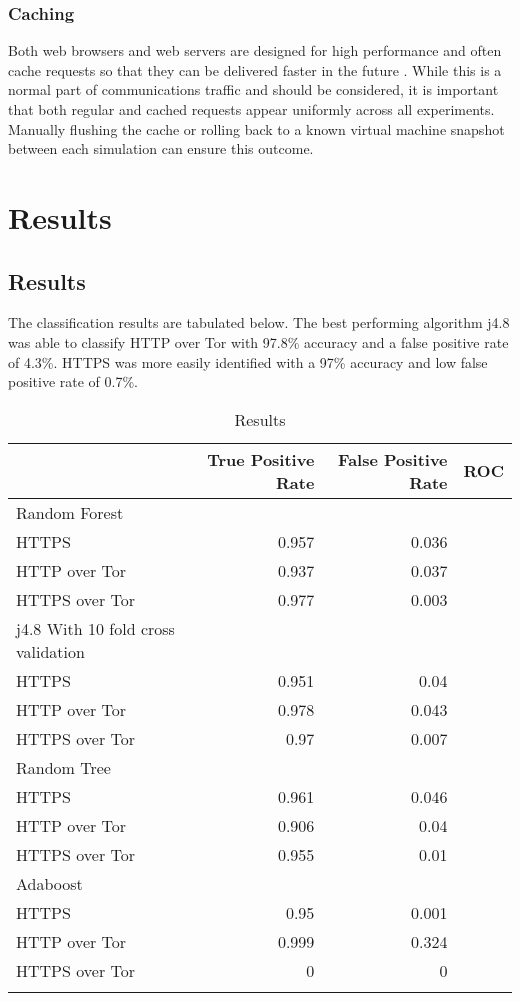 \documentclass{ecuthesis}
\begin{document}
\subsection{Caching}

Both web browsers and web servers are designed for high performance and often
cache requests so that they can be delivered faster in the future
\parencite{Caceres:1998p7419}. While this is a normal part of communications
traffic and should be considered, it is important that both regular and cached
requests appear uniformly across all experiments. Manually flushing the cache
or rolling back to a known virtual machine snapshot between each simulation can
ensure this outcome.



\chapter{Results}

\section{Results}

The classification results are tabulated below. The best performing algorithm
j4.8 was able to classify HTTP over Tor with 97.8\% accuracy and a false
positive rate of 4.3\%. HTTPS was more easily identified with a 97\% accuracy
and low false positive rate of 0.7\%.

\begin{table}
  \begin{tabular}{lrrr}
    \toprule
    & True Positive Rate & False Positive Rate & ROC \\
    \midrule
    Random Forest\\
    \midrule
    HTTPS & 0.957 & 0.036\\
    HTTP over Tor & 0.937 & 0.037\\
    HTTPS over Tor & 0.977 & 0.003\\
    \midrule
    j4.8 With 10 fold cross validation\\
    \midrule
    HTTPS & 0.951 & 0.04\\
    HTTP over Tor & 0.978 & 0.043\\
    HTTPS over Tor & 0.97 & 0.007\\
    \midrule
    Random Tree\\
    \midrule
    HTTPS & 0.961 & 0.046\\
    HTTP over Tor & 0.906 & 0.04\\
    HTTPS over Tor & 0.955 & 0.01\\
    \midrule
    Adaboost\\
    \midrule
    HTTPS & 0.95 & 0.001\\
    HTTP over Tor & 0.999 & 0.324\\
    HTTPS over Tor & 0 & 0\\
    \bottomrule
    \label{table:results}
  \end{tabular}
  \caption{Results}
\end{table}
\end{document}
